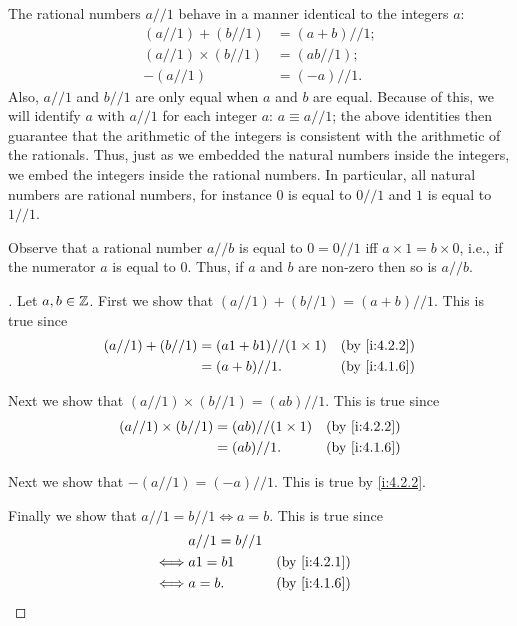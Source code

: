 \begin{ac}\label{i:ac:4.2.2}
  The rational numbers \(a // 1\) behave in a manner identical to the integers \(a\):
  \begin{align*}
    (a // 1) + (b // 1)      & = (a + b) // 1; \\
    (a // 1) \times (b // 1) & = (ab // 1);    \\
    -(a // 1)                & = (-a) // 1.
  \end{align*}
  Also, \(a // 1\) and \(b // 1\) are only equal when \(a\) and \(b\) are equal.
  Because of this, we will identify \(a\) with \(a // 1\) for each integer \(a\): \(a \equiv a // 1\);
  the above identities then guarantee that the arithmetic of the integers is consistent with the arithmetic of the rationals.
  Thus, just as we embedded the natural numbers inside the integers, we embed the integers inside the rational numbers.
  In particular, all natural numbers are rational numbers, for instance \(0\) is equal to \(0 // 1\) and \(1\) is equal to \(1 // 1\).

  Observe that a rational number \(a // b\) is equal to \(0 = 0 // 1\) iff \(a \times 1 = b \times 0\), i.e., if the numerator \(a\) is equal to \(0\).
  Thus, if \(a\) and \(b\) are non-zero then so is \(a // b\).
\end{ac}

\begin{proof}[]
  Let \(a, b \in \mathbb{Z}\).
  First we show that \((a // 1) + (b // 1) = (a + b) // 1\).
  This is true since
  \begin{align*}
    (a // 1) + (b // 1) & = (a1 + b1) // (1 \times 1) &  & \by{i:4.2.2} \\
                        & = (a + b) // 1.             &  & \by{i:4.1.6}
  \end{align*}

  Next we show that \((a // 1) \times (b // 1) = (ab) // 1\).
  This is true since
  \begin{align*}
    (a // 1) \times (b // 1) & = (ab) // (1 \times 1) &  & \by{i:4.2.2} \\
                             & = (ab) // 1.           &  & \by{i:4.1.6}
  \end{align*}

  Next we show that \(-(a // 1) = (-a) // 1\).
  This is true by \cref{i:4.2.2}.

  Finally we show that \(a // 1 = b // 1 \iff a = b\).
  This is true since
  \begin{align*}
         & a // 1 = b // 1                   \\
    \iff & a1 = b1         &  & \by{i:4.2.1} \\
    \iff & a = b.          &  & \by{i:4.1.6}
  \end{align*}
\end{proof}

